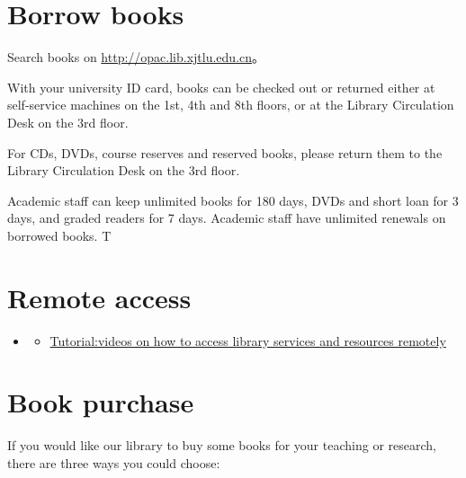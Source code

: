 \documentclass[
]{book}
\providecommand{\tightlist}{%
  \setlength{\itemsep}{0pt}\setlength{\parskip}{0pt}}
\newenvironment{rmdblock}[1]
  {\begin{shaded*}
  \begin{itemize}
  \renewcommand{\labelitemi}{
    \raisebox{-.7\height}[0pt][0pt]{
      {\setkeys{Gin}{width=2em,keepaspectratio}\texttt{[image: image/\#1]}}
    }
  }
  \item
  }
  {
  \end{itemize}
  \end{shaded*}
  }
\newenvironment{rmdvd}
  {\begin{rmdblock}{vd}}
  {\end{rmdblock}}
\begin{document}
\hypertarget{borrow-books}{%
\section{Borrow books}\label{borrow-books}}

Search books on \url{http://opac.lib.xjtlu.edu.cn}。

With your university ID card, books can be checked out or returned either at self-service machines on the 1st, 4th and 8th floors, or at the Library Circulation Desk on the 3rd floor.

For CDs, DVDs, course reserves and reserved books, please return them to the Library Circulation Desk on the 3rd floor.

Academic staff can keep unlimited books for 180 days, DVDs and short loan for 3 days, and graded readers for 7 days. Academic staff have unlimited renewals on borrowed books. T

\hypertarget{remote-access}{%
\section{Remote access}\label{remote-access}}

\begin{rmdvd}
\begin{itemize}
\tightlist
\item
  \href{https://box.xjtlu.edu.cn/smart-link/9d8e7934-d6eb-4400-9285-8f6c14933ed9/}{Tutorial:videos on how to access library services and resources remotely}
\end{itemize}
\end{rmdvd}

\hypertarget{book-purchase}{%
\section{Book purchase}\label{book-purchase}}

If you would like our library to buy some books for your teaching or research, there are three ways you could choose:
\end{document}
